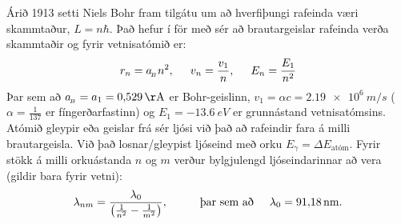 \ifdefined \wholebook \else\documentclass[oneside]{book}\usepackage{EdlBook}\graphicspath{{figures/}}
\begin{document}
\begin{tcolorbox}
Árið 1913 setti Niels Bohr fram tilgátu um að hverfiþungi rafeinda væri skammtaður, $L = n\hbar$. Það hefur í för með sér að brautargeislar rafeinda verða skammtaðir og fyrir vetnisatómið er:
\begin{align*}
    r_n = a_{\!_B}n^2, \hspace{0.5cm} v_n = \frac{v_1}{n}, \hspace{0.5cm} E_n = \frac{E_1}{n^2}
\end{align*}
Þar sem að $a_{\!_B} = a_1 = \SI{0.529}{\AA}$ er Bohr-geislinn, $v_1 = \alpha c = \SI{2.19e6}{m/s}$ ($\alpha = \frac{1}{137}$ er fíngerðarfastinn) og $E_1 = \SI{-13.6}{eV}$ er grunnástand vetnisatómsins. Atómið gleypir eða geislar frá sér ljósi við það að rafeindir fara á milli brautargeisla. Við það losnar/gleypist ljóseind með orku $E_\gamma = \Delta E_{\text{atóm}}$. Fyrir stökk á milli orkuástanda $n$ og $m$ verður bylgjulengd ljóseindarinnar að vera (gildir bara fyrir vetni):
\begin{align*}
    \lambda_{nm} = \frac{\lambda_0}{\left( \frac{1}{n^2} - \frac{1}{m^2}\right)}, \hspace{1cm} \text{þar sem að} \hspace{0.5cm} \lambda_0 = \SI{91.18}{nm}.
\end{align*}
\end{tcolorbox}
\end{document}
